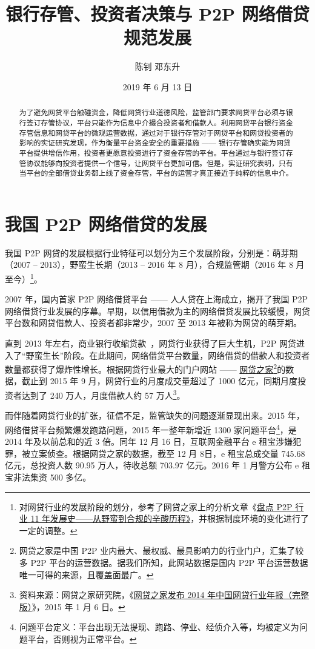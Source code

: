 \documentclass[lang=cn,11pt]{elegantpaper}
\title{银行存管、投资者决策与 P2P 网络借贷规范发展}
\author{陈钊 \quad 邓东升}
\institute{复旦大学 \; 经济学院}
\date{2019 年 6 月 13 日}
\begin{document}
\maketitle

\begin{abstract}
为了避免网贷平台触碰资金，降低网贷行业道德风险，监管部门要求网贷平台必须与银行签订存管协议，平台只能作为信息中介撮合投资者和借款人。利用网贷平台银行资金存管信息和网贷平台的微观运营数据，通过对于银行存管对于网贷平台和网贷投资者的影响的实证研究发现，作为衡量平台资金安全的重要措施 —— 银行存管确实能为网贷平台提供增信作用，投资者更愿意投资进行了资金存管的平台。平台通过与银行签订存管协议能够向投资者提供一个信号，让网贷平台更加可信。但是，实证研究表明，只有当平台的全部借贷业务都上线了资金存管，平台的运营才真正接近于纯粹的信息中介。
\end{abstract}

\section{我国 P2P 网络借贷的发展}
我国 P2P 网贷的发展根据行业特征可以划分为三个发展阶段，分别是：萌芽期（2007 -- 2013），野蛮生长期（2013 -- 2016 年 8 月），合规监管期（2016 年 8 月至今）\footnote{对网贷行业的发展阶段的划分，参考了网贷之家上的分析文章《\href{https://www.wdzj.com/zhuanlan/guancha/17-10089-1.html}{盘点 P2P 行业 11 年发展史——从野蛮到合规的辛酸历程》}，并根据制度环境的变化进行了一定的调整。}。

2007 年，国内首家 P2P 网络借贷平台 —— 人人贷在上海成立，揭开了我国 P2P 网络借贷行业发展的序幕。早期，以信用借款为主的网络借贷发展比较缓慢，网贷平台数和网贷借款人、投资者都非常少，2007 至 2013 年被称为网贷的萌芽期。

直到 2013 年左右，商业银行收缩贷款~\citep{pmm2014}，网贷行业获得了巨大生机，P2P 网贷进入了“野蛮生长”阶段。在此期间，网络借贷平台数量，网络借贷的借款人和投资者数量都获得了爆炸性增长。根据网贷行业最大的门户网站 —— \href{https://www.wdzj.com/}{网贷之家}\footnote{网贷之家是中国 P2P 业内最大、最权威、最具影响力的行业门户，汇集了较多 P2P 平台的运营数据。据我们所知，此网站数据是国内 P2P 平台运营数据唯一可得的来源，且覆盖面最广。}的数据，截止到 2015 年 9 月，网贷行业的月度成交量超过了 1000 亿元，同期月度投资者达到了 240 万人，月度借款人约 57 万人\footnote{资料来源：网贷之家研究院，《\href{https://www.wdzj.com/news/baogao/16305.html}{网贷之家发布 2014 年中国网贷行业年报（完整版）}》，2015 年 1 月 6 日。}。

而伴随着网贷行业的扩张，征信不足，监管缺失的问题逐渐显现出来。2015 年，网络借贷平台频繁爆发跑路问题，2015 年一整年新增近 1300 家问题平台\footnote{问题平台定义：平台出现无法提现、跑路、停业、经侦介入等，均被定义为问题平台，否则视为正常平台。}，是 2014 年及以前总和的近 3 倍。同年 12 月 16 日，互联网金融平台 e 租宝涉嫌犯罪，被立案侦查。根据网贷之家的数据，截至 12 月 8日，e 租宝总成交量 745.68 亿元，总投资人数 90.95 万人，待收总额 703.97 亿元。2016 年 1 月警方公布 e 租宝非法集资 500 多亿。
\end{document}
